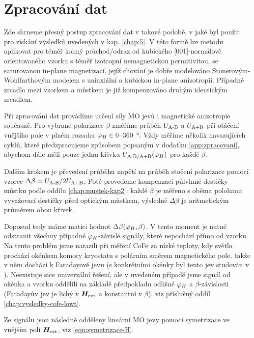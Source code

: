 \section{Zpracování dat}
\label{chap:zpracovani-dat}

Zde shrneme přesný postup zpracování dat v takové podobě, v jaké byl použit pro získání výsledků uvedených v kap. \ref{chap:5}.
V této formě lze metodu aplikovat pro téměř kolmý průchod/odraz od kubického [001]-normálově orientovaného vzorku s téměř izotropní nemagnetickou permitivitou, se saturovanou in-plane magnetizací, jejíž chování je dobře modelováno Stonerovým-Wohlfarthovým modelem s uniaxiální a kubickou in-plane anizotropií.
Případné zrcadlo mezi vzorkem a můstkem je již kompenzováno druhým identickým zrcadlem.

Při zpracování dat provádíme určení síly MO jevů i magnetické anizotropie současně.
Pro vybrané polarizace $\beta$ změříme průběh $U_\textrm{A-B}$ a $U_\textrm{A+B}$ při otáčení vnějšího pole v plném rozsahu $\varphi_H \in 0$--\SI{360}{\degree}.
Vždy měříme několik navazujících cyklů, které předzpracujeme způsobem popsaným v dodatku \ref{app:zpracovani}, abychom dále měli pouze jednu křivku $U_\textrm{A-B/A+B}(\varphi_H)$ pro každé $\beta$.

Dalším krokem je převedení průběhu napětí na průběh stočení polarizace pomocí vzorce $\Delta\beta=U_\textrm{A-B}/2U_\textrm{A+B}$.
Poté provedeme kompenzaci půlvlnné destičky můstku podle oddílu \ref{chap:mustek-kap2}: každé $\beta$ je měřeno s oběma polohami vyvažovací destičky před optickým můstkem, výsledné $\Delta\beta$ je aritmetickým průměrem obou křivek.

Doposud tedy máme matici hodnot $\Delta\beta(\varphi_H, \beta)$.
V tento moment je nutné odstranit všechny případné $\varphi_H$-závislé signály, které nepochází přímo od vzorku.
Na tento problém jsme narazili při měření CoFe za nízké teploty, kdy světlo prochází okénkem komory kryostatu s polárním směrem magnetického pole, takže v něm dochází k Faradayově jevu (s konkrétními okénky byl tento jev studován v \cite{baduraMagnetooptickaMereniPro2019}).
Neexistuje sice univerzální řešení, ale v uvedeném případě jsme signál od okénka a vzorku oddělili na základě předpokladu odlišné $\varphi_H$ a $\beta$-závislosti (Faradayův jev je lichý v $\bm{H}_\textrm{ext}$ a konstantní v $\beta$), viz příslušný oddíl \ref{chap:vysledky-cofe-lowt}.

Ze signálu jsou následně odděleny lineární MO jevy pomocí symetrizace ve vnějším poli $\bm{H}_\textrm{ext}$, viz \eqref{eqn:symetrizace-H}.

